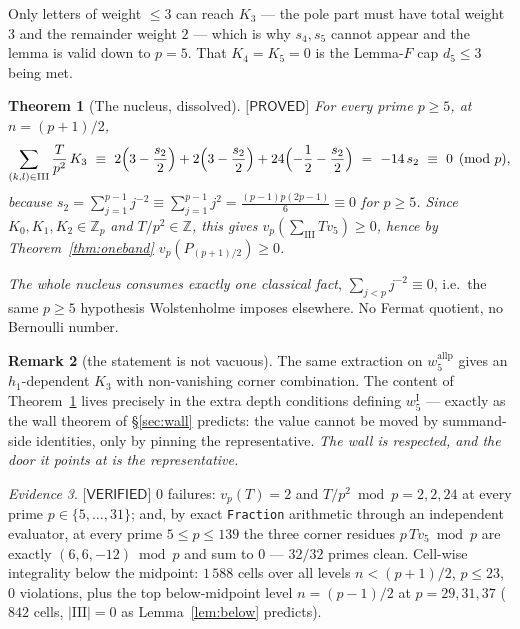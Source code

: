 \documentclass[11pt,reqno]{amsart}
\theoremstyle{plain}
\newtheorem{theorem}{Theorem}[section]
\theoremstyle{definition}
\newtheorem{remark}[theorem]{Remark}
\theoremstyle{remark}
\newtheorem{evidence}[theorem]{Evidence}
\numberwithin{equation}{section}
\newcommand{\ZZ}{\mathbb{Z}}
\newcommand{\Zp}{\ZZ_p}
\newcommand{\vfive}{v_5}
\newcommand{\PROVED}{\textsf{[PROVED]}}
\newcommand{\VERIFIED}{\textsf{[VERIFIED]}}
\begin{document}
Only letters of weight $\le3$ can reach $K_3$ --- the pole part must have total weight $3$ and
the remainder weight $2$ --- which is why $s_4,s_5$ cannot appear and the lemma is valid down to
$p=5$. That $K_4=K_5=0$ is the Lemma-$F$ cap $d_5\le3$ being met.

\begin{theorem}[The nucleus, dissolved]\label{thm:nucleus}
$\PROVED$ For every prime $p\ge5$, at $n=(p+1)/2$,
\[
\sum_{(k,l)\in\mathrm{III}}\frac{T}{p^2}\,K_3
\ \equiv\ 2\Bigl(3-\frac{s_2}{2}\Bigr)+2\Bigl(3-\frac{s_2}{2}\Bigr)+24\Bigl(-\frac12-\frac{s_2}{2}\Bigr)
\ =\ -14\,s_2\ \equiv\ 0\pmod p,
\]
because $s_2=\sum_{j=1}^{p-1}j^{-2}\equiv\sum_{j=1}^{p-1}j^{2}=\frac{(p-1)p(2p-1)}{6}\equiv0$
for $p\ge5$. Since $K_0,K_1,K_2\in\Zp$ and $T/p^2\in\ZZ$, this gives
$v_p(\sum_{\mathrm{III}}T\vfive)\ge0$, hence by Theorem~\ref{thm:oneband}
$v_p(P_{(p+1)/2})\ge0$.
\end{theorem}

\emph{The whole nucleus consumes exactly one classical fact}, $\sum_{j<p}j^{-2}\equiv0$, i.e.\
the same $p\ge5$ hypothesis Wolstenholme imposes elsewhere. No Fermat quotient, no Bernoulli
number.

\begin{remark}[the statement is not vacuous]
The same extraction on $w_5^{\mathrm{allp}}$ gives an $h_1$-dependent $K_3$ with non-vanishing
corner combination. The content of Theorem~\ref{thm:nucleus} lives precisely in the extra depth
conditions defining $w_5^{\mathrm I}$ --- exactly as the wall theorem of \S\ref{sec:wall}
predicts: the value cannot be moved by summand-side identities, only by pinning the
representative. \emph{The wall is respected, and the door it points at is the representative.}
\end{remark}

\begin{evidence}\label{ev:corner}
$\VERIFIED$ $0$ failures: $v_p(T)=2$ and $T/p^2\bmod p=2,2,24$ at every prime
$p\in\{5,\dots,31\}$; and, by exact \texttt{Fraction} arithmetic through an independent
evaluator, at every prime $5\le p\le139$ the three corner residues $p\,T\vfive\bmod p$ are
exactly $(6,6,-12)\bmod p$ and sum to $0$ --- $32/32$ primes clean. Cell-wise integrality below
the midpoint: $1\,588$ cells over all levels $n<(p+1)/2$, $p\le23$, $0$ violations, plus the top
below-midpoint level $n=(p-1)/2$ at $p=29,31,37$ ($842$ cells, $|\mathrm{III}|=0$ as
Lemma~\ref{lem:below} predicts).
\end{evidence}
\end{document}
